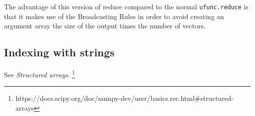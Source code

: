 \documentclass[UTF8]{article}
\begin{document}
The advantage of this version of reduce compared to the normal \texttt{ufunc.reduce} is that it
makes use of the Broadcasting Rules in order to avoid creating an argument array the size of the
output times the number of vectors.

\subsection{Indexing with strings}
See \emph{Structured arrays}.
\footnote{https://docs.scipy.org/doc/numpy-dev/user/basics.rec.html\#structured-arrays}
\end{document}
